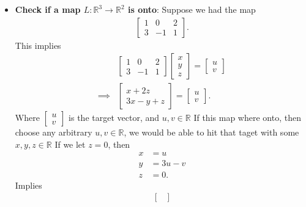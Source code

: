 \documentclass{report}
\begin{document}
\begin{itemize}
\begin{itemize}
            \item \textbf{Check if a map $L: \mathbb{R}^{3} \to \mathbb{R}^{2} $ is onto}:  
                Suppose we had the map
                \begin{align*}
                    \begin{bmatrix} 1 & 0 & 2 \\ 3 & -1 & 1 \end{bmatrix}
                .\end{align*}
                This implies
                \begin{align*}
                    &\begin{bmatrix} 1& 0 & 2 \\ 3 & -1 & 1\end{bmatrix} \begin{bmatrix} x\\ y\\ z \end{bmatrix} = \begin{bmatrix} u \\ v\end{bmatrix} \\
                    \implies &\begin{bmatrix} x + 2z \\ 3x-y+z \end{bmatrix} = \begin{bmatrix} u \\ v \end{bmatrix}
                .\end{align*}
                \bigbreak \noindent 
                Where $\begin{bmatrix} u\\v\end{bmatrix} $ is the target vector, and $u,v \in \mathbb{R}$
                \bigbreak \noindent 
                If this map where onto, then choose any arbitrary $u,v \in \mathbb{R}$, we would be able to hit that taget with some $x,y,z \in \mathbb{R}$
                \bigbreak \noindent 
                If we let $z=0$, then
                \begin{align*}
                    x  &= u \\
                    y &= 3u-v \\
                    z &= 0
                .\end{align*}
                Implies
                \begin{align*}
                    \begin{bmatrix}

\end{bmatrix}
\end{align*}
\end{itemize}
\end{itemize}
\end{document}

